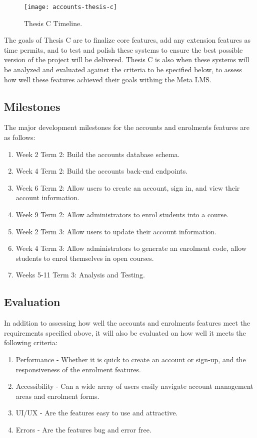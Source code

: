 \begin{figure}[h!]
    \centering
    \texttt{[image: accounts-thesis-c]}
    \caption{Thesis C Timeline.}
\end{figure}
The goals of Thesis C are to finalize core features, add any extension features as time permits, and to test and polish these systems to ensure the best possible version of the project will be delivered. Thesis C is also when these systems will be analyzed and evaluated against the criteria to be specified below, to assess how well these features achieved their goals withing the Meta LMS.

\subsection{Milestones}
The major development milestones for the accounts and enrolments features are as follows:
    \begin{enumerate}
        \item Week 2 Term 2: Build the accounts database schema.
        \item Week 4 Term 2: Build the accounts back-end endpoints.
        \item Week 6 Term 2: Allow users to create an account, sign in, and view their account information.
        \item Week 9 Term 2: Allow administrators to enrol students into a course.
        \item Week 2 Term 3: Allow users to update their account information.
        \item Week 4 Term 3: Allow administrators to generate an enrolment code, allow students to enrol themselves in open courses.
        \item Weeks 5-11 Term 3: Analysis and Testing.
    \end{enumerate}

\subsection{Evaluation}
In addition to assessing how well the accounts and enrolments features meet the requirements specified above, it will also be evaluated on how well it meets the following criteria:
\begin{enumerate}
    \item Performance - Whether it is quick to create an account or sign-up, and the responsiveness of the enrolment features.
    \item Accessibility - Can a wide array of users easily navigate account management areas and enrolment forms.
    \item UI/UX - Are the features easy to use and attractive.
    \item Errors - Are the features bug and error free.
\end{enumerate}
